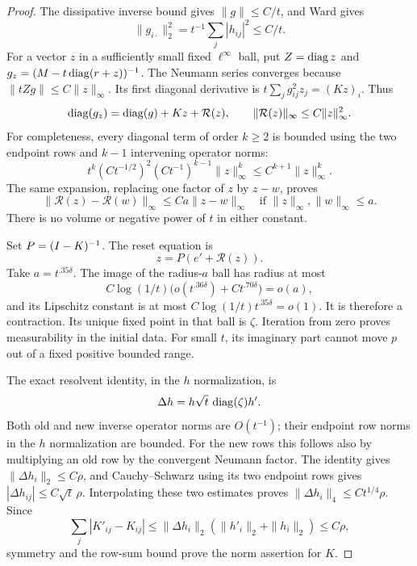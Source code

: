 \begin{proof}
The dissipative inverse bound gives $\|g\|\le C/t$, and Ward gives
\[
 \|g_{i\cdot}\|_2^2
 =t^{-1}\sum_j|h_{ij}|^2\le C/t.
\]
For a vector $z$ in a sufficiently small fixed $\ell^\infty$ ball,
put $Z=\operatorname{diag} z$ and $g_z=(M-t\operatorname{diag}(r+z))^{-1}$.
The Neumann series converges because $\|tZg\|\le C\|z\|_\infty$.
Its first diagonal derivative is
$t\sum_jg_{ij}^2z_j=(Kz)_i$. Thus
\begin{equation}
 \operatorname{diag}(g_z)=\operatorname{diag}(g)+Kz+\mathcal R(z),\qquad
 \|\mathcal R(z)\|_\infty\le C\|z\|_\infty^2.
 \label{eq:assembly-reset-taylor}
\end{equation}
For completeness, every diagonal term of order $k\ge2$ is bounded
using the two endpoint rows and $k-1$ intervening operator norms:
\[
 t^k(Ct^{-1/2})^2(Ct^{-1})^{k-1}\|z\|_\infty^k
 \le C^{k+1}\|z\|_\infty^k.
\]
The same expansion, replacing one factor of $z$ by $z-w$, proves
\[
 \|\mathcal R(z)-\mathcal R(w)\|_\infty
 \le C a\|z-w\|_\infty
 \quad\text{if }\|z\|_\infty,\|w\|_\infty\le a.
\]
There is no volume or negative power of $t$ in either constant.

Set $P=(I-K)^{-1}$. The reset equation is
\[
 z=P(e'+\mathcal R(z)).
\]
Take $a=t^{.35\delta}$. The image of the radius-$a$ ball has radius
at most
\[
 C\log(1/t)\bigl(o(t^{.36\delta})+Ct^{.70\delta}\bigr)=o(a),
\]
and its Lipschitz constant is at most
$C\log(1/t)t^{.35\delta}=o(1)$.
It is therefore a contraction. Its unique fixed point in that ball is
$\zeta$. Iteration from zero proves measurability in the initial data.
For small $t$, its imaginary part cannot move $p$ out of a fixed
positive bounded range.

The exact resolvent identity, in the $h$ normalization, is
\[
 \Delta h=h\sqrt t\,\operatorname{diag}(\zeta)h'.
\]
Both old and new inverse operator norms are $O(t^{-1})$; their endpoint
row norms in the $h$ normalization are bounded. For the new rows this
follows also by multiplying an old row by the convergent Neumann factor.
The identity gives $\|\Delta h_i\|_2\le C\rho$, and Cauchy--Schwarz
using its two endpoint rows gives $|\Delta h_{ij}|\le C\sqrt t\,\rho$.
Interpolating these two estimates proves
$\|\Delta h_i\|_4\le Ct^{1/4}\rho$.
Since
\[
 \sum_j|K'_{ij}-K_{ij}|
 \le \|\Delta h_i\|_2(\|h'_i\|_2+\|h_i\|_2)\le C\rho,
\]
symmetry and the row-sum bound prove the norm assertion for $K$.


\end{proof}

